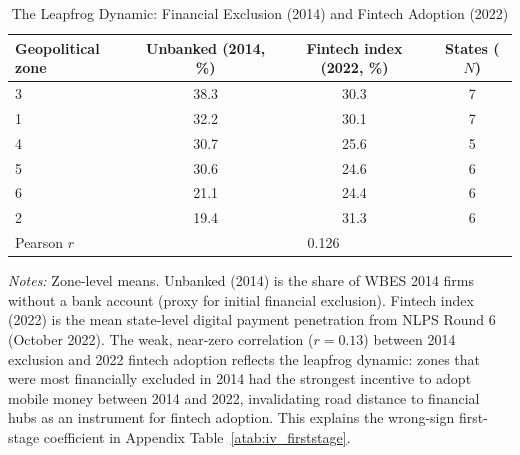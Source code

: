\begin{table}[H]
\begin{threeparttable}
\caption{The Leapfrog Dynamic: Financial Exclusion (2014) and Fintech Adoption (2022)}
\label{atab:leapfrog}
\small\begin{tabular}{lccc}
\toprule
Geopolitical zone & Unbanked (2014, \%) & Fintech index (2022, \%) & States ($N$) \\
\midrule
3 & 38.3 & 30.3 & 7 \\
1 & 32.2 & 30.1 & 7 \\
4 & 30.7 & 25.6 & 5 \\
5 & 30.6 & 24.6 & 6 \\
6 & 21.1 & 24.4 & 6 \\
2 & 19.4 & 31.3 & 6 \\
\midrule
Pearson $r$ & \multicolumn{3}{c}{0.126} \\
\bottomrule
\end{tabular}
\begin{tablenotes}\footnotesize
\item \textit{Notes:} Zone-level means. Unbanked (2014) is the share of WBES 2014 firms without a bank account (proxy for initial financial exclusion). Fintech index (2022) is the mean state-level digital payment penetration from NLPS Round 6 (October 2022). The weak, near-zero correlation ($r=0.13$) between 2014 exclusion and 2022 fintech adoption reflects the leapfrog dynamic: zones that were most financially excluded in 2014 had the strongest incentive to adopt mobile money between 2014 and 2022, invalidating road distance to financial hubs as an instrument for fintech adoption. This explains the wrong-sign first-stage coefficient in Appendix Table~\ref{atab:iv_firststage}.
\end{tablenotes}\end{threeparttable}\end{table}
